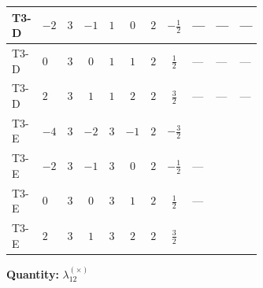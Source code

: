 \documentclass[8pt]{article}
\begin{document}
\begin{landscape}
\begin{longtable}{@{}llcccccc >{\raggedright\arraybackslash}p{0.21\linewidth} >{\raggedright\arraybackslash}p{0.21\linewidth} >{\raggedright\arraybackslash}p{0.21\linewidth}@{}}
\midrule
T3-D & $-2$ & $3$ & $-1$ & $1$ & $0$ & $2$ & $-\frac{1}{2}$ & --- & --- & --- \\
\midrule
T3-D & $0$ & $3$ & $0$ & $1$ & $1$ & $2$ & $\frac{1}{2}$ & --- & --- & --- \\
\midrule
T3-D & $2$ & $3$ & $1$ & $1$ & $2$ & $2$ & $\frac{3}{2}$ & --- & --- & --- \\
\midrule
T3-E & $-4$ & $3$ & $-2$ & $3$ & $-1$ & $2$ & $-\frac{3}{2}$ & \scriptsize\adjustbox{max width=\linewidth}{$\begin{gathered} +12 {g_1}^4\end{gathered}$} & \scriptsize\adjustbox{max width=\linewidth}{$\begin{gathered} +{g_1}^2 \left(-\frac{15 {\lambda_{12}^{(1)}}}{2}-30 {\lambda_{12}^{(\times)}}\right)\end{gathered}$} & \scriptsize\adjustbox{max width=\linewidth}{$\begin{gathered} +{\lambda_{12}^{(1)}}^2\end{gathered}$} \\
\midrule
T3-E & $-2$ & $3$ & $-1$ & $3$ & $0$ & $2$ & $-\frac{1}{2}$ & --- & \scriptsize\adjustbox{max width=\linewidth}{$\begin{gathered} +{g_1}^2 \left(-\frac{3 {\lambda_{12}^{(1)}}}{2}-6 {\lambda_{12}^{(\times)}}\right)\end{gathered}$} & \scriptsize\adjustbox{max width=\linewidth}{$\begin{gathered} +{\lambda_{12}^{(1)}}^2\end{gathered}$} \\
\midrule
T3-E & $0$ & $3$ & $0$ & $3$ & $1$ & $2$ & $\frac{1}{2}$ & --- & \scriptsize\adjustbox{max width=\linewidth}{$\begin{gathered} +{g_1}^2 \left(-\frac{3 {\lambda_{12}^{(1)}}}{2}-6 {\lambda_{12}^{(\times)}}\right)\end{gathered}$} & \scriptsize\adjustbox{max width=\linewidth}{$\begin{gathered} +{\lambda_{12}^{(1)}}^2\end{gathered}$} \\
\midrule
T3-E & $2$ & $3$ & $1$ & $3$ & $2$ & $2$ & $\frac{3}{2}$ & \scriptsize\adjustbox{max width=\linewidth}{$\begin{gathered} +12 {g_1}^4\end{gathered}$} & \scriptsize\adjustbox{max width=\linewidth}{$\begin{gathered} +{g_1}^2 \left(-\frac{15 {\lambda_{12}^{(1)}}}{2}-30 {\lambda_{12}^{(\times)}}\right)\end{gathered}$} & \scriptsize\adjustbox{max width=\linewidth}{$\begin{gathered} +{\lambda_{12}^{(1)}}^2\end{gathered}$} \\
\midrule
\bottomrule
\end{longtable}
\clearpage
\noindent\textbf{Quantity: }$\lambda_{12}^{(\times)}$\par\smallskip

\end{landscape}
\end{document}
